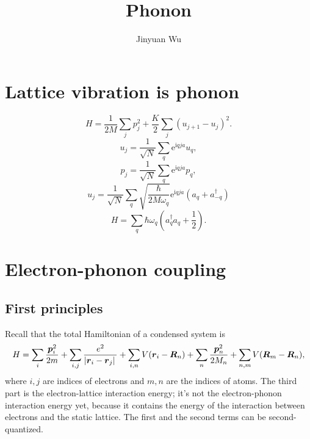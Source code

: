 \documentclass[hyperref, a4paper]{article}
\title{Phonon}
\author{Jinyuan Wu}
\newcommand*{\ii}{\mathrm{i}}
\newcommand*{\ee}{\mathrm{e}}
\begin{document}
\maketitle

\section{Lattice vibration is phonon}

\begin{equation}
    H = \frac{1}{2M} \sum_{j} {p}_j^2 + \frac{K}{2} \sum_{j} ({u}_{j+1} - {u}_j)^2.
\end{equation}
\begin{equation}
    {u}_j = \frac{1}{\sqrt{N}} \sum_q \ee^{\ii q j a} {u}_q,
\end{equation}
\begin{equation}
    {p}_j = \frac{1}{\sqrt{N}} \sum_q \ee^{\ii q j a} {p}_q,
\end{equation}
\begin{equation}
    u_j = \frac{1}{\sqrt{N}} \sum_q \sqrt{\frac{\hbar}{2 M \omega_q}} \ee^{\ii q j a}
    (a_q + a_{-q}^\dagger)
\end{equation}
\begin{equation}
    H = \sum_q \hbar \omega_q \left(
        a^\dagger_q a_q + \frac{1}{2}
    \right).
\end{equation}

\section{Electron-phonon coupling}

\subsection{First principles}

Recall that the total Hamiltonian of a condensed system is 
\begin{equation}
    H = \sum_{i} \frac{\vb*{p}_i^2}{2m} 
    + \sum_{i, j} \frac{e^2}{\abs*{\vb*{r}_i - \vb*{r}_j}}
    + \sum_{i, n} V(\vb*{r}_i - \vb*{R}_n)
    + \sum_{n} \frac{\vb*{p}_n^2}{2M_n}
    + \sum_{n, m} V(\vb*{R}_m - \vb*{R}_n),
\end{equation} 
where $i, j$ are indices of electrons 
and $m, n$ are the indices of atoms. 
The third part is the electron-lattice interaction energy; 
it's not the electron-phonon interaction energy yet, 
because it contains the energy of the interaction 
between electrons and the static lattice. 
The first and the second terms can be second-quantized.
\end{document}
